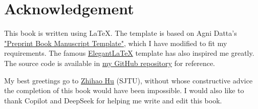 \chapter*{Acknowledgement}
This book is written using \LaTeX. The template is based on Agni Datta's \href{https://www.overleaf.com/latex/templates/preprint-book-manuscript-template/ghrbwppzhzjx}{"Preprint Book Manuscript Template"}, which I have modified to fit my requirements. 
The famous \href{https://github.com/ElegantLaTeX/ElegantLaTeX}{ElegantLaTeX} template has also inspired me greatly. The source code is available in \href{https://github.com/guo-zhenran/Maths-for-Economists}{my GitHub repository} for reference.

My best greetings go to \href{https://minamomo127430.github.io/}{Zhihao Hu} (SJTU), without whose constructive advice the completion of this book would have been impossible. I would also like to thank Copilot and DeepSeek for helping me write and edit this book. 